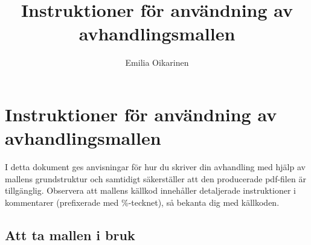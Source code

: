 \documentclass[swedish, manual, a4paper]{csthesis}
\begin{document}
\title{Instruktioner för användning av avhandlingsmallen}
\author{Emilia Oikarinen}
\thispagestyle{empty}
\maketitle


\cleardoublepage
{}
\tableofcontents
\cleardoublepage
{}

\chapter{Instruktioner för användning av avhandlingsmallen}
\label{app:instructions_swedish}

I detta dokument ges anvisningar för hur du skriver din avhandling med hjälp av mallens grundstruktur och samtidigt säkerställer att den producerade pdf-filen är tillgänglig. Observera att mallens källkod innehåller detaljerade instruktioner i kommentarer (prefixerade med \%-tecknet), så bekanta dig med källkoden.

\section{Att ta mallen i bruk}
\end{document}
